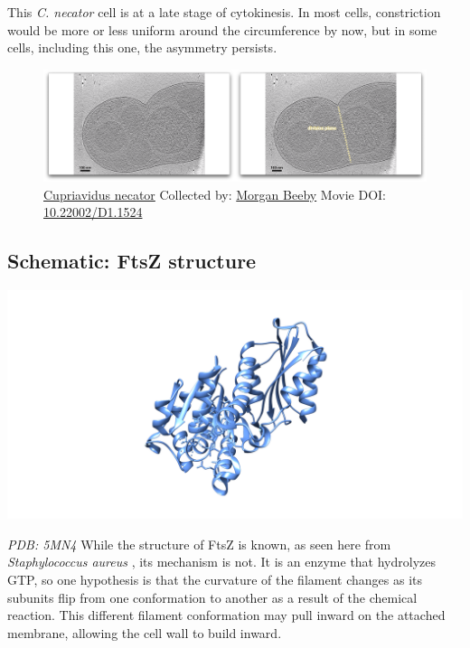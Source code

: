 \documentclass[]{tufte-book}
\begin{document}
This \emph{C. necator} cell is at a late stage of cytokinesis. In most
cells, constriction would be more or less uniform around the
circumference by now, but in some cells, including this one, the
asymmetry persists.





\begin{figure}
\includegraphics{movie_stills/5_9a} \caption[\protect\hyperlink{tree}{Cupriavidus necator} Collected by:
\protect\hyperlink{morgan_beeby}{Morgan Beeby} Movie DOI:
\href{https://doi.org/10.22002/D1.1524}{10.22002/D1.1524}]{\protect\hyperlink{tree}{Cupriavidus necator} Collected by:
\protect\hyperlink{morgan_beeby}{Morgan Beeby} Movie DOI:
\href{https://doi.org/10.22002/D1.1524}{10.22002/D1.1524}}\label{fig:5-9a}
\end{figure}

\hypertarget{FtsZ_structure}{\subsection*{Schematic: FtsZ
structure}\label{FtsZ_structure}}

\includegraphics{img/schematics/5_9_1}

\emph{PDB: 5MN4} While the structure of FtsZ is known, as seen here from
\emph{Staphylococcus aureus} \citep{wagstaff2017}, its mechanism is not.
It is an enzyme that hydrolyzes GTP, so one hypothesis is that the
curvature of the filament changes as its subunits flip from one
conformation to another as a result of the chemical reaction. This
different filament conformation may pull inward on the attached
membrane, allowing the cell wall to build inward.
\end{document}
